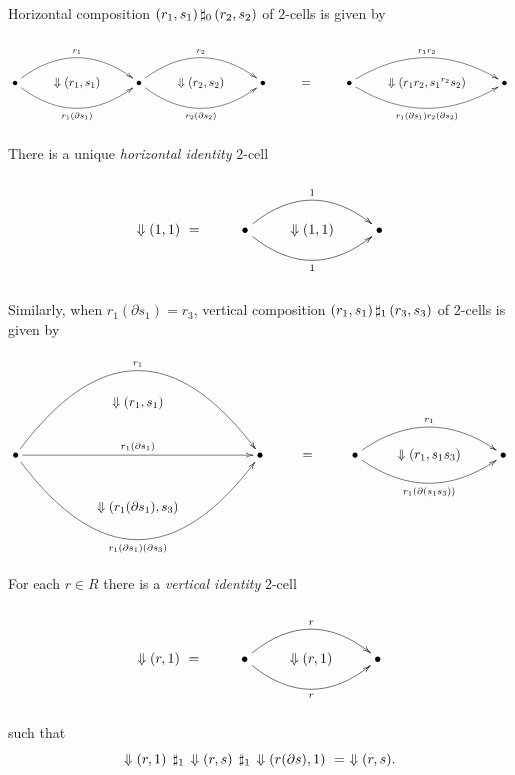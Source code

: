 \noindent
Horizontal composition $(r_1,s_1) \,\sharp_0\, (r_2,s_2)$ 
of $2$-cells is given by
$$
\xy
\xymatrix{
  & &  & & & & & & \\
  \bullet \ar@/^5ex/[rr]^{r_1} 
          \ar@/_5ex/[rr]_{r_1(\partial s_1)} 
  & \Downarrow (r_1,s_1)
    & \bullet \ar@/^5ex/[rr]^{r_2} 
              \ar@/_5ex/[rr]_{r_2(\partial s_2)} 
      & \Downarrow (r_2,s_2)
        & \bullet 
          & = 
            & \bullet \ar@/^5ex/[rr]^{r_1r_2} 
                      \ar@/_5ex/[rr]_{r_1(\partial s_1)r_2(\partial s_2)} 
              & \Downarrow (r_1r_2,{s_1}^{r_2}{s_2})
                & \bullet \\
  & & & & & & & & \\
}
\endxy
$$

\noindent
There is a unique \emph{horizontal identity} $2$-cell
$$
\xy
\xymatrix{
   & & & \\
 \Downarrow(1,1)~=
   & \bullet  \ar@/^5ex/[rr]^{1} 
             \ar@/_5ex/[rr]_{1} 
     & \Downarrow (1,1)
        & \bullet \\
   & & & \\
}
\endxy
$$

\noindent
Similarly, when $r_1(\partial s_1) = r_3$,
vertical composition $(r_1,s_1) \,\sharp_1\, (r_3,s_3)$ 
of $2$-cells is given by
$$
\xy
\xymatrix{
  && && & & && \\
  && \Downarrow (r_1,s_1)
     && & & && \\
  \bullet \ar@/^15ex/[rrrr]^{r_1} 
          \ar[rrrr]^{r_1(\partial s_1)}
          \ar@/_15ex/[rrrr]_{r_1(\partial s_1)(\partial s_3)} 
  && && \bullet 
        &=& \bullet \ar@/^5ex/[rr]^{r_1} 
                    \ar@/_5ex/[rr]_{r_1(\partial(s_1s_3))} 
            & \Downarrow (r_1,s_1s_3)
             & \bullet \\
  && \Downarrow (r_1(\partial s_1),s_3)
     && & & && \\
  && && & & && \\
}
\endxy
$$

\medskip\noindent
For each $r \in R$ there is a \emph{vertical identity} $2$-cell 
$$
\xy
\xymatrix{
   & & & \\
 \Downarrow(r,1)~=
   & \bullet  \ar@/^5ex/[rr]^{r} 
             \ar@/_5ex/[rr]_{r} 
     & \Downarrow (r,1)
        & \bullet \\
   & & & \\
}
\endxy
$$
such that
$$
\Downarrow(r,1)\; \,\sharp_1\, \Downarrow(r,s)\; 
                  \,\sharp_1\, \Downarrow(r(\partial s),1)
~=~ \Downarrow(r,s).
$$

